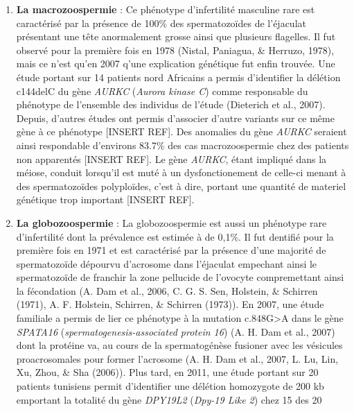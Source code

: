 \documentclass[12pt,twoside]{reedthesis}
\providecommand{\tightlist}{%
  \setlength{\itemsep}{0pt}\setlength{\parskip}{0pt}}
\theoremstyle{definition}
\theoremstyle{definition}
\theoremstyle{remark}
\begin{document}
\begin{enumerate}
    \begin{enumerate}
    \def\labelenumii{\alph{enumii}.}
    \tightlist
    \item
      \textbf{La macrozoospermie} : Ce phénotype d'infertilité masculine
      rare est caractérisé par la présence de 100\% des spermatozoïdes de
      l'éjaculat présentant une tête anormalement grosse ainsi que
      plusieurs flagelles. Il fut observé pour la première fois en 1978
      (Nistal, Paniagua, \& Herruzo, 1978), mais ce n'est qu'en 2007 q'une
      explication génétique fut enfin trouvée. Une étude portant sur 14
      patients nord Africains a permis d'identifier la délétion c144delC
      du gène \emph{AURKC} (\emph{Aurora kinase C}) comme responsable du
      phénotype de l'ensemble des individus de l'étude (Dieterich et al.,
      2007). Depuis, d'autres études ont permis d'associer d'autre
      variants sur ce même gène à ce phénotype {[}INSERT REF{]}. Des
      anomalies du gène \emph{AURKC} seraient ainsi respondable d'environs
      83.7\% des cas macrozoospermie chez des patients non apparentés
      {[}INSERT REF{]}. Le gène \emph{AURKC}, étant impliqué dans la
      méiose, conduit lorsqu'il est muté à un dysfonctionement de celle-ci
      menant à des spermatozoïdes polyploïdes, c'est à dire, portant une
      quantité de materiel génétique trop important {[}INSERT REF{]}.\\
    \item
      \textbf{La globozoospermie} : La globozoospermie est aussi un
      phénotype rare d'infertilité dont la prévalence est estimée à de
      0,1\%. Il fut dentifié pour la première fois en 1971 et est
      caractérisé par la présence d'une majorité de spermatozoïde dépourvu
      d'acrosome dans l'éjaculat empechant ainsi le spermatozoïde de
      franchir la zone pellucide de l'ovocyte compremettant ainsi la
      fécondation (A. Dam et al., 2006, C. G. S. Sen, Holstein, \&
      Schirren (1971), A. F. Holstein, Schirren, \& Schirren (1973)). En
      2007, une étude familiale a permis de lier ce phénotype à la
      mutation c.848G\textgreater{}A dans le gène \emph{SPATA16}
      (\emph{spermatogenesis-associated protein 16}) (A. H. Dam et al.,
      2007) dont la protéine va, au cours de la spermatogénèse fusioner
      avec les vésicules proacrosomales pour former l'acrosome (A. H. Dam
      et al., 2007, L. Lu, Lin, Xu, Zhou, \& Sha (2006)). Plus tard, en
      2011, une étude portant sur 20 patients tunisiens permit
      d'identifier une délétion homozygote de 200 kb emportant la totalité
      du gène \emph{DPY19L2} (\emph{Dpy-19 Like 2}) chez 15 des 20

\end{enumerate}
\end{enumerate}
\end{document}
